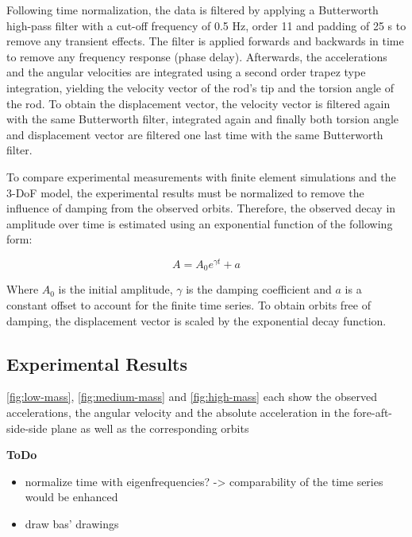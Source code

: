 \documentclass{article}
\begin{document}
Following time normalization, the data is filtered by applying a Butterworth high-pass filter with a cut-off frequency of 0.5 Hz, order 11 and padding of 25 s to remove any transient effects. The filter is applied forwards and backwards in time to remove any frequency response (phase delay). Afterwards, the accelerations and the angular velocities are integrated using a second order trapez type integration, yielding the velocity vector of the rod's tip and the torsion angle of the rod. To obtain the displacement vector, the velocity vector is filtered again with the same Butterworth filter, integrated again and finally both torsion angle and displacement vector are filtered one last time with the same Butterworth filter.

To compare experimental measurements with finite element simulations and the 3-DoF model, the experimental results must be normalized to remove the influence of damping from the observed orbits. Therefore, the observed decay in amplitude over time is estimated using an exponential function of the following form:

\begin{equation}
    A = A_0 e ^ {\gamma t} + a
\end{equation}

Where $A_0$ is the initial amplitude, $\gamma$ is the damping coefficient and $a$ is a constant offset to account for the finite time series. To obtain orbits free of damping, the displacement vector is scaled by the exponential decay function. 

\subsection{Experimental Results}

\autoref{fig:low-mass}, \autoref{fig:medium-mass} and \autoref{fig:high-mass} each show the observed accelerations, the angular velocity and the absolute acceleration in the fore-aft-side-side plane as well as the corresponding orbits

\textbf{ToDo}

\begin{itemize}
    \item normalize time with eigenfrequencies? -> comparability of the time series would be enhanced
    \item draw bas' drawings
\end{itemize}

\end{document}

